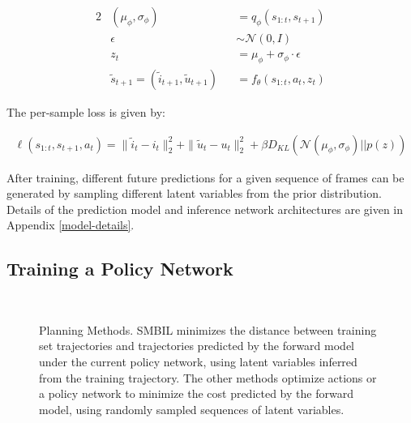 \documentclass{article} %
\begin{document}
\begin{alignat}{2}
  \label{eq:update-eqn}
  &(\mu_\phi, \sigma_\phi) &&= q_\phi(s_{1:t}, s_{t+1}) \\
  &\epsilon &&\sim \mathcal{N}(0, I) \\
  &z_t &&= \mu_\phi + \sigma_\phi \cdot \epsilon \\
  &\tilde{s}_{t+1} = (\tilde{i}_{t+1}, \tilde{u}_{t+1}) &&= f_\theta(s_{1:t}, a_t, z_t)
\end{alignat}




The per-sample loss is given by:

\begin{align}
  \label{eq:update-eqn}
  \ell(s_{1:t}, s_{t+1}, a_t) = \|\tilde{i}_t - i_t \|_2^2 + \| \tilde{u}_t - u_t \|_2^2 + \beta D_{KL}(\mathcal{N}(\mu_\phi, \sigma_\phi) || p(z))
\end{align}

After training, different future predictions for a given sequence of frames can be generated by sampling different latent variables from the prior distribution.
Details of the prediction model and inference network architectures are given in Appendix \ref{model-details}.

\subsection{Training a Policy Network}


\begin{figure}[ht!]
    \centering
     \\
    \label{planning-methods}
    \caption{Planning Methods. SMBIL minimizes the distance between training set trajectories and trajectories predicted by the forward model under the current policy network, using latent variables inferred from the training trajectory. The other methods optimize actions or a policy network to minimize the cost predicted by the forward model, using randomly sampled sequences of latent variables.}
\end{figure}
\end{document}
